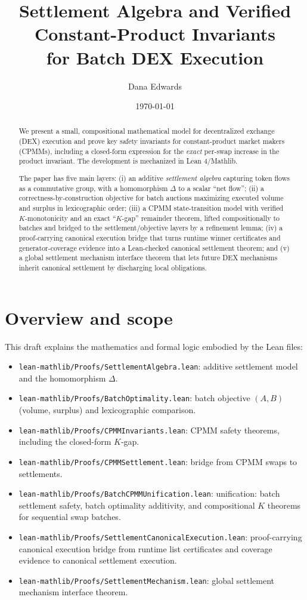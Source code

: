 \documentclass[11pt]{article}
\title{Settlement Algebra and Verified Constant-Product Invariants\\for Batch DEX Execution}
\author{Dana Edwards}
\date{\today}
\theoremstyle{remark}
\begin{document}
\maketitle

\begin{abstract}
We present a small, compositional mathematical model for decentralized exchange (DEX)
execution and prove key safety invariants for constant-product market makers (CPMMs),
including a closed-form expression for the \emph{exact} per-swap increase in the product
invariant. The development is mechanized in Lean 4/Mathlib.

The paper has five main layers:
(i) an additive \emph{settlement algebra} capturing token flows as a commutative group,
with a homomorphism $\Delta$ to a scalar ``net flow'';
(ii) a correctness-by-construction objective for batch auctions maximizing executed
volume and surplus in lexicographic order;
(iii) a CPMM state-transition model with verified $K$-monotonicity and an exact
``$K$-gap'' remainder theorem, lifted compositionally to batches and bridged to the
settlement/objective layers by a refinement lemma;
(iv) a proof-carrying canonical execution bridge that turns runtime winner
certificates and generator-coverage evidence into a Lean-checked canonical
settlement theorem; and
(v) a global settlement mechanism interface theorem that lets future DEX
mechanisms inherit canonical settlement by discharging local obligations.
\end{abstract}

\section{Overview and scope}
\label{sec:overview}

This draft explains the mathematics and formal logic embodied by the Lean files:
\begin{itemize}[leftmargin=2em]
  \item \texttt{lean-mathlib/Proofs/SettlementAlgebra.lean}: additive settlement model and the homomorphism $\Delta$.
  \item \texttt{lean-mathlib/Proofs/BatchOptimality.lean}: batch objective $(A,B)$ (volume, surplus) and lexicographic comparison.
  \item \texttt{lean-mathlib/Proofs/CPMMInvariants.lean}: CPMM safety theorems, including the closed-form $K$-gap.
  \item \texttt{lean-mathlib/Proofs/CPMMSettlement.lean}: bridge from CPMM swaps to settlements.
  \item \texttt{lean-mathlib/Proofs/BatchCPMMUnification.lean}: unification: batch settlement safety, batch optimality additivity,
        and compositional $K$ theorems for sequential swap batches.
  \item \texttt{lean-mathlib/Proofs/SettlementCanonicalExecution.lean}: proof-carrying canonical execution bridge from runtime
        list certificates and coverage evidence to canonical settlement execution.
  \item \texttt{lean-mathlib/Proofs/SettlementMechanism.lean}: global settlement mechanism interface theorem.
\end{itemize}
\end{document}
